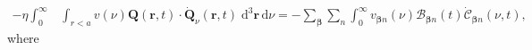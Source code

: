 \documentclass{article}
\begin{document}
\begin{equation}
\begin{split}
-\eta\int_0^\infty&\int_{r<a} v(\nu)\mathbf{Q}(\mathbf{r},t)\cdot\dot{\mathbf{Q}}_\nu(\mathbf{r},t)\;\mathrm{d}^3\mathbf{r}\,\mathrm{d}\nu
= -\sum_{\bm{\beta}}\sum_{n}\int_0^\infty v_{\bm{\beta}n}(\nu)\mathcal{B}_{\bm{\beta}n}(t)\dot{\mathcal{C}}_{\bm{\beta}n}(\nu,t),
\end{split}
\end{equation}
where
\end{document}
